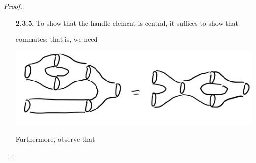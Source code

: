 \documentclass[ 12pt ]{article}
\begin{document}
\begin{enumerate}
\begin{proof}
\begin{enumerate}
				\item[\textbf{2.3.5.}] To show that the handle element is central, it suffices to show that
				\begin{center}
				\end{center}
				commutes; that is, we need
				\begin{center}
					\includegraphics[scale=0.1]{goal}
				\end{center}
				Furthermore, observe that
				\begin{center}

\end{center}
\end{enumerate}
\end{proof}
\end{enumerate}
\end{document}
